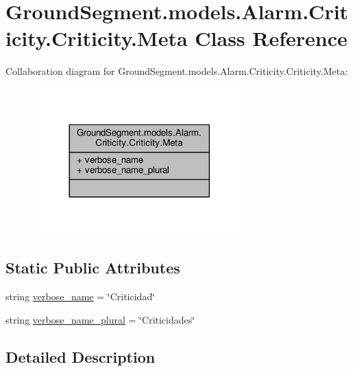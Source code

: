 \hypertarget{class_ground_segment_1_1models_1_1_alarm_1_1_criticity_1_1_criticity_1_1_meta}{}\section{Ground\+Segment.\+models.\+Alarm.\+Criticity.\+Criticity.\+Meta Class Reference}
\label{class_ground_segment_1_1models_1_1_alarm_1_1_criticity_1_1_criticity_1_1_meta}


Collaboration diagram for Ground\+Segment.\+models.\+Alarm.\+Criticity.\+Criticity.\+Meta\+:\nopagebreak
\begin{figure}[H]
\begin{center}
\leavevmode
\includegraphics[width=233pt]{class_ground_segment_1_1models_1_1_alarm_1_1_criticity_1_1_criticity_1_1_meta__coll__graph}
\end{center}
\end{figure}
\subsection*{Static Public Attributes}
\begin{DoxyCompactItemize}
\item 
string \hyperlink{class_ground_segment_1_1models_1_1_alarm_1_1_criticity_1_1_criticity_1_1_meta_a77545e85b931b43e2c2c1075e2dc7b89}{verbose\+\_\+name} = \char`\"{}Criticidad\char`\"{}
\item 
string \hyperlink{class_ground_segment_1_1models_1_1_alarm_1_1_criticity_1_1_criticity_1_1_meta_a27f1d87c0d59a1686bcb0026bd3bb25c}{verbose\+\_\+name\+\_\+plural} = \char`\"{}Criticidades\char`\"{}
\end{DoxyCompactItemize}


\subsection{Detailed Description}


